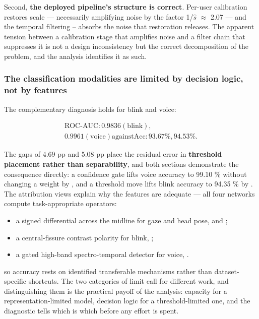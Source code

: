 Second, \textbf{the deployed pipeline's structure is correct}. Per-user calibration  restores scale --- necessarily amplifying noise by the factor 1/$\hat{s}$ $\approx$ 2.07 --- and the temporal filtering -- absorbs the noise that restoration releases. The apparent tension between a calibration stage that amplifies noise and a filter chain that suppresses it is not a design inconsistency but the correct decomposition of the problem, and the analysis identifies it as such.

\subsubsection{The classification modalities are limited by decision logic, not by features}

The complementary diagnosis holds for blink and voice:

\begin{equation}
\label{eq:292}
\begin{aligned}
\mathrm{ROC\text{-}AUC}: 0.9836 (\text{blink}) , \\
0.9961 (\text{voice}) \mathrm{against} \mathrm{Acc}: 93.67 \% , 94.53 \% .
\end{aligned}
\end{equation}

The gaps of 4.69 pp and 5.08 pp place the residual error in \textbf{threshold placement rather than separability}, and both sections demonstrate the consequence directly: a confidence gate lifts voice accuracy to 99.10 \% without changing a weight by , and a threshold move lifts blink accuracy to 94.35 \% by . The attribution views explain why the features are adequate --- all four networks compute task-appropriate operators:

\begin{itemize}
\item a signed differential across the midline for gaze and head pose,  and ;
\item a central-fissure contrast polarity for blink, ;
\item a gated high-band spectro-temporal detector for voice, .
\end{itemize}

so accuracy rests on identified transferable mechanisms rather than dataset-specific shortcuts. The two categories of limit call for different work, and distinguishing them is the practical payoff of the analysis: capacity for a representation-limited model, decision logic for a threshold-limited one, and the diagnostic  tells which is which before any effort is spent.

